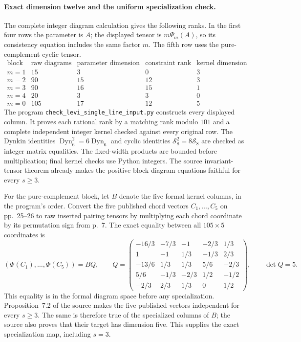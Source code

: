 
\paragraph{Exact dimension twelve and the uniform specialization check.}
The complete integer diagram calculation gives the following ranks.
In the first four rows the parameter is $A$; the displayed tensor
is $m\Psi_m(A)$, so its consistency equation includes the same
factor $m$. The fifth row uses the pure-complement cyclic tensor.
\[
\begin{array}{c|r|r|r|r}
\text{block}&\text{raw diagrams}&\text{parameter dimension}
   &\text{constraint rank}&\text{kernel dimension}\\\hline
m=1&15&3&0&3\\
m=2&90&15&12&3\\
m=3&90&16&15&1\\
m=4&20&3&3&0\\
m=0&105&17&12&5
\end{array}
\]
The program \texttt{check\_levi\_single\_line\_input.py}
constructs every displayed column. It proves each rational rank
by a matching rank modulo $101$ and a complete independent
integer kernel checked against every original row. The Dynkin
identities $\operatorname{Dyn}_6^2=6\operatorname{Dyn}_6$
and cyclic identities $\mathcal S_8^2=8\mathcal S_8$ are checked
as integer matrix equalities. The fixed-width products are
bounded before multiplication; final kernel checks use Python
integers. The source invariant-tensor theorem already makes
the positive-block diagram equations faithful for every $s\geq3$.

For the pure-complement block, let $B$ denote the five formal
kernel columns, in the program's order. Convert the five published
chord vectors $C_1,\ldots,C_5$ on pp.~25--26 to raw inserted
pairing tensors by multiplying each chord coordinate by its
permutation sign from p.~7. The exact equality between all
$105\times5$ coordinates is
\[
 (\Phi(C_1),\ldots,\Phi(C_5))=B Q,\qquad
 Q=\begin{pmatrix}
 -16/3&-7/3&-1&-2/3&1/3\\
 1&-1&1/3&-1/3&2/3\\
 -13/6&1/3&1/3&5/6&-2/3\\
 5/6&-1/3&-2/3&1/2&-1/2\\
 -2/3&2/3&1/3&0&1/2
 \end{pmatrix},\qquad \det Q=5.
\]
This equality is in the formal diagram space before any
specialization. Proposition~7.2 of the source makes the five
published vectors independent for every $s\geq3$. The same is
therefore true of the specialized columns of $B$; the source
also proves that their target has dimension five. This supplies
the exact specialization map, including $s=3$.

